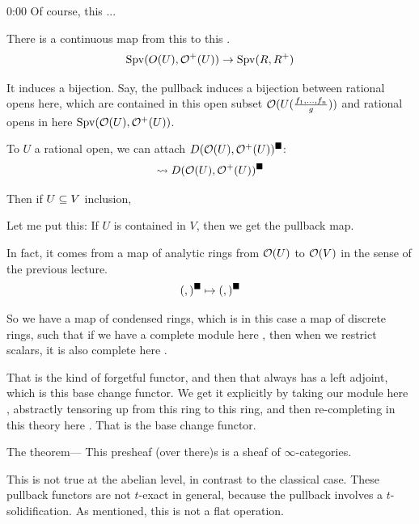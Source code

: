 \begin{unfinished}{0:00}
\ques Of course, this ... 

\ans There is a continuous map from this to this .
\begin{align*}
\operatorname{Spv}(O(U), \mathcal O^+(U)) \to \operatorname{Spv}(R,R^+)
\end{align*}

It induces a bijection. Say, the pullback induces a bijection between rational opens here, which are contained in this open subset  $\mathcal O(U(\frac{f_1, \ldots, f_n}{g}))$ and rational opens in here $ \operatorname{Spv}(\mathcal O(U), \mathcal O^+(U))$.

\ques {}

To $U$ a rational open, we can attach $D(\mathcal O(U), \mathcal O^+(U))^\blacksquare$: 
\begin{align*}
\leadsto D(\mathcal O(U), \mathcal O^+(U))^\blacksquare
\end{align*}

Then if $U \subseteq V$ inclusion, 

% 
Let me put this: If $U$ is contained in $V$, then we get the pullback map. 

In fact, it comes from a map of analytic rings from $\mathcal O(U)$ to $\mathcal O(V)$ in the sense of the previous lecture. 
\begin{align*}
( , )^\blacksquare \mapsto ( , )^\blacksquare
\end{align*}

So we have a map of condensed rings, which is in this case a map of discrete rings, such that if we have a complete module here , then when we restrict scalars, it is also complete here . 

That is the kind of forgetful functor, and then that always has a left adjoint, which is this base change functor. We get it explicitly by taking our module here , abstractly tensoring up from this ring to this ring, and then re-completing in this theory here . That is the base change functor.

% 
\begin{theorem}
The theorem---
This presheaf (over there)s is a sheaf of $\infty$-categories.
\end{theorem}

\begin{warning}
This is not true at the abelian level, in contrast to the classical case. These pullback functors are not $t$-exact in general, because the pullback involves a $t$-solidification. As mentioned, this is not a flat operation. 
\end{warning}


\end{unfinished}
